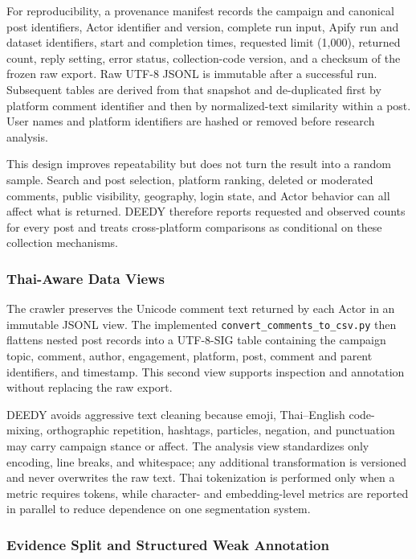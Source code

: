 \documentclass[conference]{IEEEtran}
\begin{document}
For reproducibility, a provenance manifest records the campaign and canonical
post identifiers, Actor identifier and version, complete run input, Apify run
and dataset identifiers, start and completion times, requested limit
(1,000), returned count, reply setting, error status, collection-code version,
and a checksum of the frozen raw export. Raw UTF-8 JSONL is immutable after a
successful run. Subsequent tables are derived from that snapshot and
de-duplicated first by platform comment identifier and then by normalized-text
similarity within a post. User names and platform identifiers are hashed or
removed before research analysis.

This design improves repeatability but does not turn the result into a random
sample. Search and post selection, platform ranking, deleted or moderated
comments, public visibility, geography, login state, and Actor behavior can all
affect what is returned. DEEDY therefore reports requested and observed counts
for every post and treats cross-platform comparisons as conditional on these
collection mechanisms.

\subsubsection{Thai-Aware Data Views}

The crawler preserves the Unicode comment text returned by each Actor in an
immutable JSONL view. The implemented
\texttt{convert\_comments\_to\_csv.py} then flattens nested post records into a
UTF-8-SIG table containing the campaign topic, comment, author, engagement,
platform, post, comment and parent identifiers, and timestamp. This second view
supports inspection and annotation without replacing the raw export.

DEEDY avoids aggressive text cleaning because emoji, Thai--English
code-mixing, orthographic repetition, hashtags, particles, negation, and
punctuation may carry campaign stance or affect. The analysis view standardizes
only encoding, line breaks, and whitespace; any additional transformation is
versioned and never overwrites the raw text. Thai tokenization is performed
only when a metric requires tokens, while character- and embedding-level
metrics are reported in parallel to reduce dependence on one segmentation
system.

\subsubsection{Evidence Split and Structured Weak Annotation}
\end{document}
